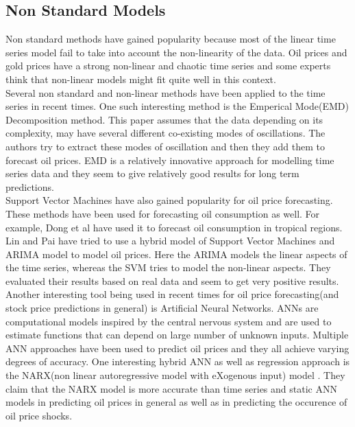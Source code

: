 \documentclass[runningheads]{llncs}
\begin{document}
\subsection{Non Standard Models}

\noindent Non standard methods have gained popularity because most of the linear time series model fail to take into account the non-linearity of the data. Oil prices and gold prices have a strong non-linear and chaotic time series and some experts think that non-linear models might fit quite well in this context.\\

\noindent Several non standard and non-linear methods have been applied to the time series in recent times. One such interesting method is the Emperical Mode(EMD) Decomposition method\cite{oil-zhang}. This paper assumes that the data depending on its complexity, may have several different co-existing modes of oscillations. The authors try to extract these modes of oscillation and then they add them to forecast oil prices. EMD is a relatively innovative approach for modelling time series data and they seem to give relatively good results for long term predictions.\\

\noindent Support Vector Machines have also gained popularity for oil price forecasting. These methods have been used for forecasting oil consumption as well. For example, Dong et al \cite{dongbing} have used it to forecast oil consumption in tropical regions. Lin and Pai  \cite{linpai} have tried to use a hybrid model of Support Vector Machines and ARIMA model to model oil prices. Here the ARIMA models the linear aspects of the time series, whereas the SVM tries to model the non-linear aspects. They evaluated their results based on real data and seem to get very positive results.\\

\noindent Another interesting tool being used in recent times for oil price forecasting(and stock price predictions in general) is Artificial Neural Networks. ANNs are computational models inspired by the central nervous system and are used to estimate functions that can depend on large number of unknown inputs. Multiple ANN approaches have been used to predict oil prices and they all achieve varying degrees of accuracy. One interesting hybrid ANN as well as regression approach is the NARX(non linear autoregressive model with eXogenous input) model \cite{oil-ann}. They claim that the NARX model is more accurate than time series and static ANN models in predicting oil prices in general as well as in predicting the occurence of oil price shocks.\\
   
\end{document}
